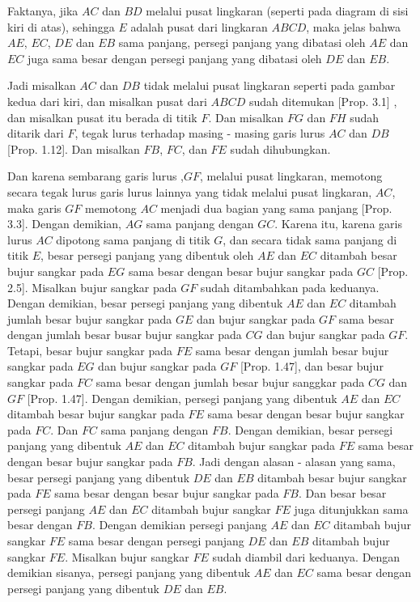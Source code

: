 \documentclass[a4paper]{book}
\begin{document}
Faktanya, jika $AC$ dan $BD$ melalui pusat lingkaran (seperti pada diagram di sisi 
kiri di atas), sehingga $E$ adalah pusat dari lingkaran $ABCD$, maka jelas bahwa
$AE$, $EC$, $DE$ dan $EB$ sama panjang, persegi panjang yang dibatasi oleh $AE$
dan $EC$ juga sama besar dengan persegi panjang yang dibatasi oleh $DE$ dan $EB$.

Jadi misalkan $AC$ dan $DB$ tidak melalui pusat lingkaran seperti pada gambar
kedua dari kiri, dan misalkan pusat dari $ABCD$ sudah ditemukan [Prop. 3.1] , 
dan misalkan pusat itu berada di titik $F$. Dan misalkan $FG$ dan $FH$ sudah 
ditarik dari $F$, tegak lurus terhadap masing - masing garis  lurus $AC$ dan
$DB$ [Prop. 1.12]. Dan misalkan $FB$, $FC$,  dan $FE$ sudah dihubungkan.

Dan karena sembarang garis lurus ,$GF$, melalui pusat lingkaran, memotong 
secara tegak lurus garis lurus lainnya yang tidak melalui pusat lingkaran,
 $AC$, maka garis $GF$ memotong $AC$ menjadi dua bagian yang sama panjang
[Prop. 3.3]. Dengan demikian, $AG$ sama panjang dengan $GC$. Karena itu,
karena garis lurus $AC$ dipotong sama  panjang di titik $G$, dan secara tidak
sama panjang di titik $E$, besar persegi panjang yang dibentuk oleh $AE$ 
dan $EC$ ditambah besar bujur sangkar pada $EG$ sama besar dengan besar bujur
sangkar pada $GC$ [Prop. 2.5]. Misalkan bujur sangkar pada $GF$ sudah 
ditambahkan pada keduanya. Dengan demikian, besar persegi panjang yang dibentuk
$AE$ dan $EC$ ditambah jumlah besar bujur sangkar pada $GE$ dan bujur sangkar 
pada $GF$ sama besar dengan jumlah besar busar bujur sangkar pada $CG$ dan 
bujur sangkar pada $GF$. Tetapi, besar bujur sangkar pada $FE$  sama besar
dengan jumlah besar bujur sangkar pada $EG$ dan bujur sangkar pada $GF$ 
[Prop. 1.47], dan besar bujur sangkar pada $FC$ sama besar dengan jumlah besar
bujur sanggkar pada  $CG$ dan $GF$ [Prop. 1.47]. Dengan demikian, persegi 
panjang yang dibentuk $AE$ dan $EC$ ditambah besar bujur sangkar pada $FE$ sama
besar dengan besar bujur sangkar pada $FC$. Dan $FC$ sama panjang dengan $FB$.
Dengan demikian, besar persegi panjang yang dibentuk $AE$ dan $EC$ ditambah
bujur sangkar pada $FE$ sama besar dengan besar bujur sangkar pada $FB$. Jadi
dengan alasan - alasan yang sama, besar persegi panjang yang dibentuk $DE$ dan
$EB$ ditambah besar bujur sangkar pada $FE$ sama besar dengan besar bujur 
sangkar pada $FB$. Dan besar besar persegi panjang $AE$ dan $EC$ ditambah 
bujur sangkar $FE$ juga ditunjukkan sama besar dengan $FB$. Dengan demikian
persegi panjang $AE$ dan $EC$ ditambah bujur sangkar $FE$ sama besar dengan
persegi panjang $DE$ dan $EB$ ditambah bujur sangkar $FE$. Misalkan bujur 
sangkar $FE$ sudah diambil dari keduanya. Dengan demikian sisanya, persegi 
panjang yang dibentuk $AE$ dan $EC$ sama besar dengan persegi panjang
yang dibentuk $DE$ dan $EB$.
\end{document}
